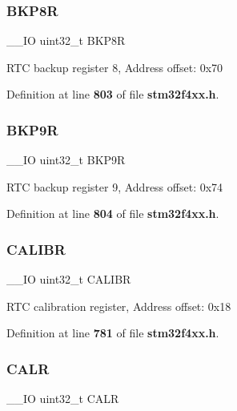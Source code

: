 \mbox{\label{structRTC__TypeDef_ac1085f6aae54b353c30871fe90c59851}} 
\subsubsection{B\+K\+P8R}
{\footnotesize\ttfamily \+\_\+\+\_\+\+IO uint32\+\_\+t B\+K\+P8R}

R\+TC backup register 8, Address offset\+: 0x70 

Definition at line \textbf{ 803} of file \textbf{ stm32f4xx.\+h}.

\mbox{\label{structRTC__TypeDef_a6c33564df6eaf97400e0457dde9b14ef}} 
\subsubsection{B\+K\+P9R}
{\footnotesize\ttfamily \+\_\+\+\_\+\+IO uint32\+\_\+t B\+K\+P9R}

R\+TC backup register 9, Address offset\+: 0x74 

Definition at line \textbf{ 804} of file \textbf{ stm32f4xx.\+h}.

\mbox{\label{structRTC__TypeDef_ab97f3e9584dda705dc10a5f4c5f6e636}} 
\subsubsection{C\+A\+L\+I\+BR}
{\footnotesize\ttfamily \+\_\+\+\_\+\+IO uint32\+\_\+t C\+A\+L\+I\+BR}

R\+TC calibration register, Address offset\+: 0x18 

Definition at line \textbf{ 781} of file \textbf{ stm32f4xx.\+h}.

\mbox{\label{structRTC__TypeDef_a2ce7c3842792c506635bb87a21588b58}} 
\subsubsection{C\+A\+LR}
{\footnotesize\ttfamily \+\_\+\+\_\+\+IO uint32\+\_\+t C\+A\+LR}

